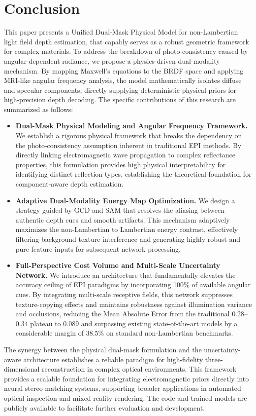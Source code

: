 \documentclass[lettersize,journal]{IEEEtran}
\begin{document}
\section{Conclusion}

This paper presents a Unified Dual-Mask Physical Model for non-Lambertian light field depth estimation, that capably serves as a robust geometric framework for complex materials. To address the breakdown of photo-consistency caused by angular-dependent radiance, we propose a physics-driven dual-modality mechanism. By mapping Maxwell's equations to the BRDF space and applying MRI-like angular frequency analysis, the model mathematically isolates diffuse and specular components, directly supplying deterministic physical priors for high-precision depth decoding. The specific contributions of this research are summarized as follows:

\begin{itemize}
    \item \textbf{Dual-Mask Physical Modeling and Angular Frequency Framework.} We establish a rigorous physical framework that breaks the dependency on the photo-consistency assumption inherent in traditional EPI methods. By directly linking electromagnetic wave propagation to complex reflectance properties, this formulation provides high physical interpretability for identifying distinct reflection types, establishing the theoretical foundation for component-aware depth estimation.
    \item \textbf{Adaptive Dual-Modality Energy Map Optimization.} We design a strategy guided by GCD and SAM that resolves the aliasing between authentic depth cues and smooth artifacts. This mechanism adaptively maximizes the non-Lambertian to Lambertian energy contrast, effectively filtering background texture interference and generating highly robust and pure feature inputs for subsequent network processing.
    \item \textbf{Full-Perspective Cost Volume and Multi-Scale Uncertainty Network.} We introduce an architecture that fundamentally elevates the accuracy ceiling of EPI paradigms by incorporating 100\% of available angular cues. By integrating multi-scale receptive fields, this network suppresses texture-copying effects and maintains robustness against illumination variance and occlusions, reducing the Mean Absolute Error from the traditional $0.28$--$0.34$ plateau to $0.089$ and surpassing existing state-of-the-art models by a considerable margin of $38.5\%$ on standard non-Lambertian benchmarks.
\end{itemize}

The synergy between the physical dual-mask formulation and the uncertainty-aware architecture establishes a reliable paradigm for high-fidelity three-dimensional reconstruction in complex optical environments. This framework provides a scalable foundation for integrating electromagnetic priors directly into neural stereo matching systems, supporting broader applications in automated optical inspection and mixed reality rendering. The code and trained models are publicly available to facilitate further evaluation and development.



\end{document}
